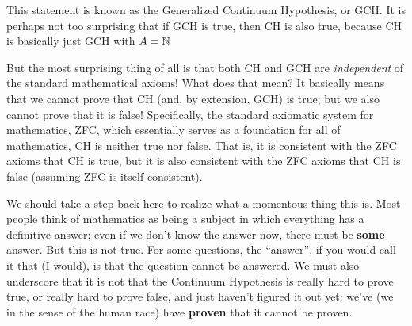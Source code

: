 This statement is known as the Generalized Continuum Hypothesis, or GCH.
It is perhaps not too surprising that if GCH is true, then CH is also true, because CH is basically just GCH with $A = \mathbb{N}$

But the most surprising thing of all is that both CH and GCH are \emph{independent} of the standard mathematical axioms!
What does that mean?
It basically means that we cannot prove that CH (and, by extension, GCH) is true; but we also cannot prove that it is false!
Specifically, the standard axiomatic system for mathematics, ZFC, which essentially serves as a foundation for all of mathematics, CH is neither true nor false.
That is, it is consistent with the ZFC axioms that CH is true, but it is also consistent with the ZFC axioms that CH is false (assuming ZFC is itself consistent).

We should take a step back here to realize what a momentous thing this is.
Most people think of mathematics as being a subject in which everything has a definitive answer; even if we don't know the answer now, there must be \textbf{some} answer.
But this is not true.
For some questions, the ``answer'', if you would call it that (I would), is that the question cannot be answered.
We must also underscore that it is not that the Continuum Hypothesis is really hard to prove true, or really hard to prove false, and just haven't figured it out yet: we've (we in the sense of the human race) have \textbf{proven} that it cannot be proven.

